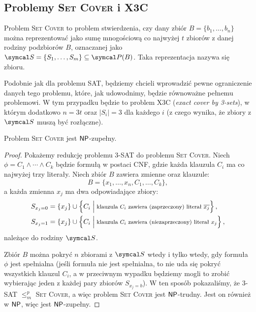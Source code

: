 \subsection{Problemy \textsc{Set Cover} i X3C}

Problem \textsc{Set Cover} to problem stwierdzenia, czy dany zbiór $B = \{b_1, \ldots, b_n\}$ można reprezentować jako sumę mnogościową co najwyżej $t$ zbiorów z danej rodziny podzbiorów $B$, oznaczanej jako $\sS = \{S_1, \ldots, S_m\} \subseteq \sP(B)$.
Taka reprezentacja nazywa się  zbioru.

Podobnie jak dla problemu SAT, będziemy chcieli wprowadzić pewne ograniczenie danych tego problemu, które, jak udowodnimy, będzie równoważne pełnemu problemowi. W tym przypadku będzie to problem X3C (\textit{exact cover by 3-sets}), w którym dodatkowo $n = 3t$ oraz $|S_i| = 3$ dla każdego $i$ (z czego wynika, że zbiory z $\sS$ muszą być rozłączne).

\begin{theorem}\label{t:Set Cover}
    Problem \textsc{Set Cover} jest $\textsf{NP}$-zupełny.
\end{theorem}
\begin{proof}
    Pokażemy redukcję problemu 3-SAT do problemu \textsc{Set Cover}. Niech $\phi = C_1 \land \cdots \land C_k$ będzie formułą w postaci CNF, gdzie każda klauzula $C_i$ ma co najwyżej trzy literały. Niech zbiór $B$ zawiera zmienne oraz klauzule:
    \[ B = \{x_1, \ldots, x_n, C_1, \ldots, C_k\}, \]
    a każda zmienna $x_j$ ma dwa odpowiadające zbiory:
    \begin{align*}
        S_{x_j = 0} &= \{x_j\} \cup \left\{C_i \Bigm| \text{\footnotesize klauzula $C_i$ zawiera (zaprzeczony) literał $\overline{x_j}$}\right\}, \\
        S_{x_j = 1} &= \{x_j\} \cup \left\{C_i \Bigm| \text{\footnotesize klauzula $C_i$ zawiera (niezaprzeczony) literał $x_j$}\right\},
    \end{align*}
    należące do rodziny $\sS$.

    Zbiór $B$ można pokryć $n$ zbiorami z $\sS$ wtedy i tylko wtedy, gdy formuła $\phi$ jest spełnialna (jeśli formuła nie jest spełnialna, to nie uda się pokryć wszystkich klauzul $C_i$, a w przeciwnym wypadku będziemy mogli to zrobić wybierając jeden z każdej pary zbiorów $S_{x_j = b}$). W ten sposób pokazaliśmy, że 3-SAT $\leq_m^p$ \textsc{Set Cover}, a więc problem \textsc{Set Cover} jest $\textsf{NP}$-trudny. Jest on również w $\textsf{NP}$, więc jest $\textsf{NP}$-zupełny.
\end{proof}

